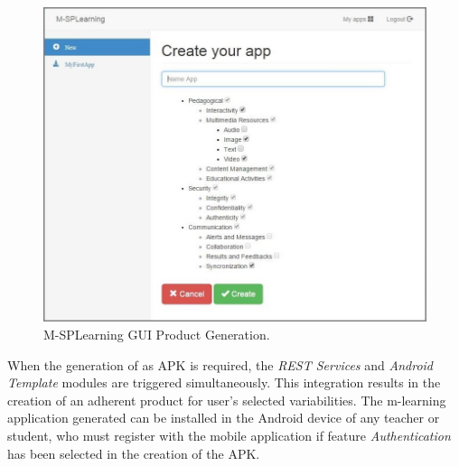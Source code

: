 
\begin{figure}
\centering
\includegraphics[scale=0.4]{figures/section3/MSPLWebGeneration}
\caption{M-SPLearning GUI Product Generation.}
\label{figureMSPLWebGeneration}
\end{figure}

When the generation of as APK is required, the \textit{REST Services} and \textit{Android Template} modules are triggered simultaneously. This integration results in the creation of an adherent product for user's selected variabilities. The m-learning application generated can be installed in the Android device of any teacher or student, who must register with the mobile application if feature \textit{Authentication} has been selected in the creation of the APK.

